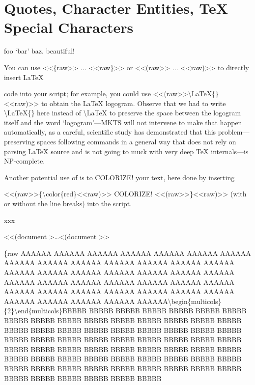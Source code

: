 \section{Quotes, Character Entities, TeX Special Characters
}
foo ‘bar’ baz.  beautiful!\mktsShowpar\par
\begin{multicols}{2}
You can use {\mktsStyleCode{}<<\{raw>> ... <<raw\}>>} or {\mktsStyleCode{}<<(raw>> ... <<raw)>>} to directly insert \LaTeX{}

code into your script; for example, you could
use {\mktsStyleCode{}<<(raw>>\textbackslash{}LaTeX\{\}<<raw)>>}
to obtain the \LaTeX{} logogram.
Observe that we had to write {\mktsStyleCode{}\textbackslash{}LaTeX\{\}} here instead of {\mktsStyleCode{}\textbackslash{}LaTeX} to preserve the space between the logogram itself and
the word ‘logogram’—MKTS will not intervene to make that happen
automatically, as a careful, scientific study has demonstrated
that this problem—preserving spaces following commands in a
general way that does not rely on parsing \LaTeX{}
source and is not going to muck with very deep
\TeX{}
internals—is NP-complete.\mktsShowpar\par
Another potential use of  is to {\color{red}COLORIZE!} your text, here done by inserting\mktsShowpar\par
\begingroup\obeyalllines\mktsStyleCode{}<<(raw>>\{\textbackslash{}color\{red\}<<raw)>>
COLORIZE!
<<(raw>>\}<<raw)>>
\endgroup{}(with or without the line breaks) into the script.
\end{multicols}xxx\mktsShowpar\par
<<{\mktsStyleBold\color{violet}{\mktsStyleSymbol█}(document {\mktsStyleSymbol}}>…<{\mktsStyleBold\color{violet}{\mktsStyleSymbol█}(document {\mktsStyleSymbol}}>>\mktsShowpar\par
{\mktsStyleBold\color{violet}{\mktsStyleSymbol█}\{raw {\mktsStyleSymbol}}
AAAAAA AAAAAA AAAAAA AAAAAA AAAAAA AAAAAA AAAAAA AAAAAA AAAAAA AAAAAA AAAAAA AAAAAA
AAAAAA AAAAAA AAAAAA AAAAAA AAAAAA AAAAAA AAAAAA AAAAAA AAAAAA AAAAAA AAAAAA AAAAAA
AAAAAA AAAAAA AAAAAA AAAAAA AAAAAA AAAAAA AAAAAA AAAAAA AAAAAA AAAAAA AAAAAA AAAAAA
AAAAAA AAAAAA AAAAAA AAAAAA\textbackslash{}begin\{multicols\}\{2\}\textbackslash{}end\{multicols\}BBBBB BBBBB BBBBB BBBBB
BBBBB BBBBB BBBBB BBBBB BBBBB BBBBB BBBBB BBBBB BBBBB BBBBB BBBBB BBBBB BBBBB BBBBB BBBBB BBBBB BBBBB BBBBB BBBBB BBBBB BBBBB
BBBBB BBBBB BBBBB BBBBB BBBBB BBBBB BBBBB BBBBB BBBBB BBBBB BBBBB BBBBB BBBBB BBBBB BBBBB BBBBB BBBBB BBBBB BBBBB BBBBB BBBBB
BBBBB BBBBB BBBBB BBBBB BBBBB BBBBB BBBBB BBBBB BBBBB BBBBB BBBBB BBBBB BBBBB BBBBB BBBBB BBBBB BBBBB BBBBB BBBBB BBBBB BBBBB
